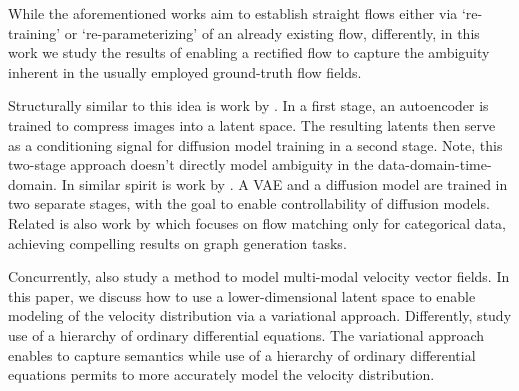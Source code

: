 While the aforementioned works aim to establish straight flows either via `re-training' or `re-parameterizing' of an already existing flow, differently, in this work we study the results of enabling a rectified flow to capture the ambiguity inherent in the usually employed ground-truth flow fields. %

Structurally similar to this idea is work by
\citet{preechakul2022diffusion}. In a first stage, an autoencoder is trained to compress images into a latent space. The resulting latents then serve as a conditioning signal for diffusion model training in a second stage. Note, this two-stage approach doesn't directly model ambiguity in the data-domain-time-domain. %
In similar spirit is work by \citet{pandey2022diffusevae}. A VAE and a diffusion model are trained in two separate stages, with the goal to enable controllability of diffusion models. %
Related is also work by \citet{eijkelboom2024variational} which focuses on flow matching  only for categorical data, achieving compelling results on graph generation tasks. 

Concurrently, \citet{ZhangICLR2025} also study a method to model multi-modal velocity vector fields. In this paper, we discuss how to use a lower-dimensional latent space to enable modeling of the velocity distribution via a variational approach. Differently, \citet{ZhangICLR2025} study use of a hierarchy of ordinary differential equations. The variational approach enables to capture semantics while use of a hierarchy of ordinary differential equations permits to more accurately model the velocity distribution.